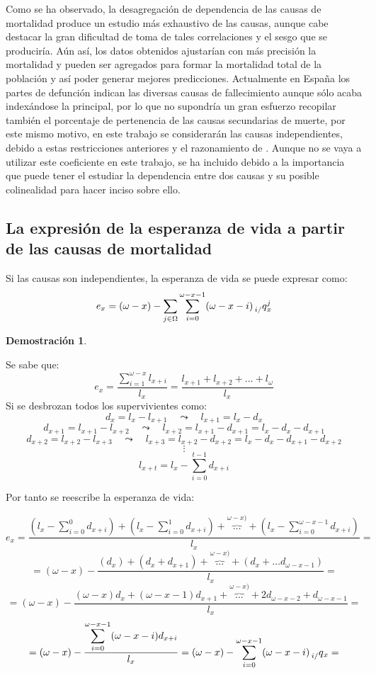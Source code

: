\documentclass{article}
\newtheorem*{dem} {Demostración}
\begin{document}
Como se ha observado, la desagregación de dependencia de las causas de mortalidad produce un estudio más exhaustivo de las causas, aunque cabe destacar la gran dificultad de toma de tales correlaciones y el sesgo que se produciría. Aún así, los datos obtenidos ajustarían con más precisión la mortalidad y pueden ser agregados para formar la mortalidad total de la población y así poder generar mejores predicciones.
Actualmente en España los partes de defunción indican las diversas causas de fallecimiento aunque sólo acaba indexándose la principal, por lo que no supondría un gran esfuerzo recopilar también el porcentaje de pertenencia de las causas secundarias de muerte, por este mismo motivo, en este trabajo se considerarán las causas independientes, debido a estas restricciones anteriores y el razonamiento de \cite{arnold2015causes}. Aunque no se vaya a utilizar este coeficiente en este trabajo, se ha incluido debido a la importancia que puede tener el estudiar la dependencia entre dos causas y su posible colinealidad para hacer inciso sobre ello.


\subsection{La expresión de la esperanza de vida a partir de las causas de mortalidad}


Si las causas son independientes, la esperanza de vida se puede expresar como:
$$
e_{x}=(\omega-x)-\sum_{j\in\Omega}\sum_{i=0}^{\omega-x-1}(\omega-x-i)\prescript{}{i/}q_{x}^{j}
$$

\begin{dem}\end{dem}
Se sabe que:
$$
e_{x}=\frac{\displaystyle\sum_{i=1}^{\omega-x}l_{x+i}}{l_{x}}=\frac{l_{x+1}+l_{x+2}+\dots + l_{\omega}}{l_{x}}
$$
Si se desbrozan todos los supervivientes como:
$$
d_{x}=l_{x}-l_{x+1}\,\,\,\,\,\,\leadsto \,\,\,\,\,\,l_{x+1}=l_{x}-d_{x}
$$
$$
d_{x+1}=l_{x+1}-l_{x+2}\,\,\,\,\,\,\leadsto \,\,\,\,\,\,l_{x+2}=l_{x+1}-d_{x+1}=l_{x}-d_{x}-d_{x+1}
$$
$$
d_{x+2}=l_{x+2}-l_{x+3}\,\,\,\,\,\,\leadsto \,\,\,\,\,\,l_{x+3}=l_{x+2}-d_{x+2}=l_{x}-d_{x}-d_{x+1}-d_{x+2}
$$
$$
\vdots
$$
$$
l_{x+t}=l_{x}-\sum_{i=0}^{t-1}d_{x+i}
$$

Por tanto se reescribe la esperanza de vida:

$$
e_{x}=\frac{\displaystyle(l_{x}-\sum_{i=0}^{0}d_{x+i})+(l_{x}-\sum_{i=0}^{1}d_{x+i})+\overbrace{\dots}^{\omega-x)}+(l_{x}-\sum_{i=0}^{\omega-x-1}d_{x+i})}{l_{x}}=
$$
$$
=(\omega-x)-\frac{(d_{x})+(d_{x}+d_{x+1})+\overbrace{\dots}^{\omega-x)}+(d_{x}+\dots d_{\omega-x-1})}{l_{x}}=
$$
$$
=(\omega-x)-\frac{(\omega-x)d_{x}+(\omega-x-1)d_{x+1}+\overbrace{\dots}^{\omega-x)}+2d_{\omega-x-2}+d_{\omega-x-1}}{l_{x}}=
$$
$$
=(\omega-x)-\frac{\displaystyle\sum_{i=0}^{\omega-x-1}(\omega-x-i)d_{x+i}}{l_{x}}=(\omega-x)-\sum_{i=0}^{\omega-x-1}(\omega-x-i)\prescript{}{i/}q_{x}=
$$
\end{document}
